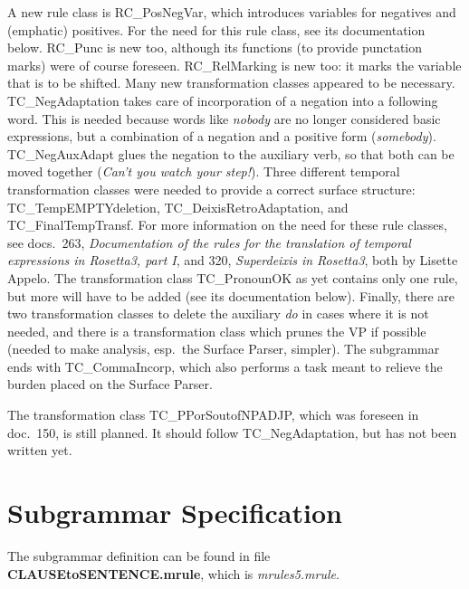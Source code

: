 A new rule class is RC\_PosNegVar, which introduces variables for negatives and 
(emphatic) positives. For the need for this rule class, see its documentation 
below. RC\_Punc is new too, although its functions (to provide 
punctation marks) were of course foreseen. RC\_RelMarking is new too: it marks 
the variable that is to be shifted. Many new transformation classes 
appeared to be necessary. TC\_NegAdaptation takes care of incorporation of a 
negation into a following word. This is needed because words like {\em nobody\/
} are no longer considered basic expressions, but a combination of a negation 
and a positive form ({\em somebody\/}). TC\_NegAuxAdapt glues the negation to 
the auxiliary verb, so that both can be moved together ({\em Can't you watch 
your step!\/}). Three different temporal transformation 
classes were needed to provide a correct surface structure: 
TC\_TempEMPTYdeletion, TC\_DeixisRetroAdaptation, and TC\_FinalTempTransf. For 
more information on the need for
these rule classes, see docs.\ 263, {\em Documentation of the rules 
for the translation of temporal expressions in Rosetta3, part I\/}, and 320, {
\em Superdeixis in Rosetta3\/}, both by Lisette Appelo. The transformation 
class TC\_PronounOK as yet contains only one rule, but more will have to be 
added (see its documentation below). Finally, there are two 
transformation classes to delete the auxiliary {\em do\/} in cases where it is 
not needed, and there is a transformation class which prunes the VP if 
possible (needed to make analysis, esp.\ the Surface Parser, simpler). The 
subgrammar ends with TC\_CommaIncorp, which also performs a task meant to 
relieve the burden placed on the Surface Parser.

The transformation class TC\_PPorSoutofNPADJP, which was foreseen in doc.\ 150, 
is still planned. It should follow TC\_NegAdaptation, but has not been written 
yet. 

\newpage
\section{Subgrammar Specification}
The subgrammar definition can be found in file {\bf CLAUSEtoSENTENCE.mrule}, 
which is {\em mrules5.mrule\/}.

